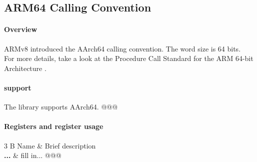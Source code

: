 %
%
%
%

\subsection{ARM64 Calling Convention}

\paragraph{Overview}

ARMv8 introduced the AArch64 calling convention.
The word size is 64 bits.\\
For more details, take a look at the Procedure Call Standard for the ARM 64-bit Architecture \cite{AArch64}.


\paragraph{ support}

The  library supports AArch64. @@@


\paragraph{Registers and register usage}

\begin{table}[h]
\begin{tabular}{3 B}
\hline
Name         & Brief description\\
\hline
{\bf ...}     & fill in... @@@\\
\hline
\end{tabular}
\caption{Register usage on arm64}
\end{table}

